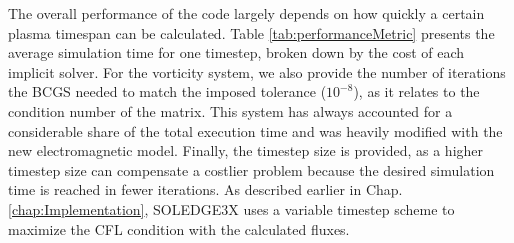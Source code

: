 The overall performance of the code largely depends on how quickly a certain plasma timespan can be calculated. Table \ref{tab:performanceMetric} presents the average simulation time for one timestep, broken down by the cost of each implicit solver. For the vorticity system, we also provide the number of iterations the BCGS needed to match the imposed tolerance ($10^{-8}$), as it relates to the condition number of the matrix. This system has always accounted for a considerable share of the total execution time and was heavily modified with the new electromagnetic model. Finally, the timestep size is provided, as a higher timestep size can compensate a costlier problem because the desired simulation time is reached in fewer iterations. As described earlier in Chap. \ref{chap:Implementation}, SOLEDGE3X uses a variable timestep scheme to maximize the CFL condition with the calculated fluxes. \newline

\begin{table}[h!]
	\centering
	\caption[Numerical metrics on the four TCV scenarios for one timestep]{Numerical metrics on the four TCV scenarios for one timestep. All quantities are averaged over the last 20000 timesteps of the simulation. The execution time refers to the wall-clock time and must be multiplied by the number of used processors (768) to get the actual used CPU time.}
	\label{tab:performanceMetric}
\end{table}

